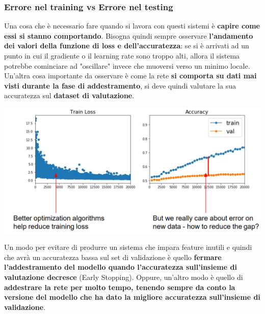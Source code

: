 \documentclass[12pt]{article}
\begin{document}
\subsubsection{Errore nel training vs Errore nel testing}
Una cosa che è necessario fare quando si lavora con questi sistemi è \textbf{capire come essi si stanno comportando}.
Bisogna quindi sempre osservare \textbf{l'andamento dei valori della funzione di loss e dell'accuratezza}: se si è arrivati ad un punto in cui il gradiente o il learning rate sono troppo alti,
allora il sistema potrebbe cominciare ad "oscillare" invece che muoversi verso un minimo locale.
Un'altra cosa importante da osservare è come la rete \textbf{si comporta su dati mai visti durante la fase di addestramento}, si deve quindi valutare la sua accuratezza sul \textbf{dataset di valutazione}.
\begin{center}
    \includegraphics[width =0.90\linewidth]{Images/177.PNG}
\end{center}
Un modo per evitare di produrre un sistema che impara feature inutili e quindi che avrà un accuratezza bassa sul set di validazione è quello \textbf{fermare l'addestramento del modello quando l'accuratezza sull'insieme di valutazione decresce} (Early Stopping).
Oppure, un'altro modo è quello di \textbf{addestrare la rete per molto tempo, tenendo sempre da conto la versione del modello che ha dato la migliore accuratezza sull'insieme di validazione}.
\end{document}
